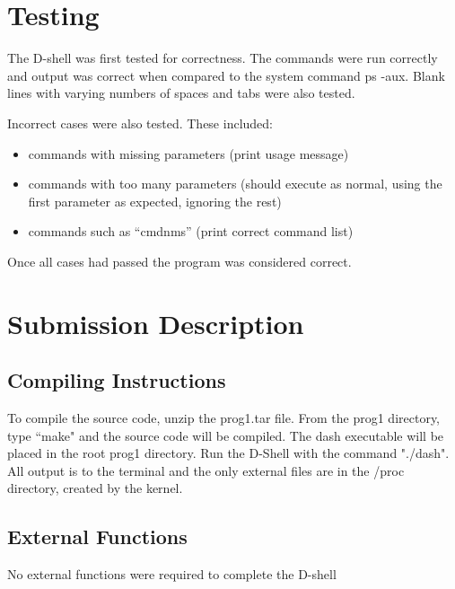 \documentclass[11pt]{article}
\begin{document}
\begin{multicols}{2}
\section{Testing}\label{testing}
The D-shell was first tested for correctness. The commands were run correctly and output was correct when compared to the system command ps -aux. Blank lines with varying numbers of spaces and tabs were also tested. 

Incorrect cases were also tested. These included:
\begin{itemize}
\item commands with missing parameters (print usage message)
\item commands with too many parameters (should execute as normal, using the first parameter as expected, ignoring the rest)
\item commands such as ``cmdnms'' (print correct command list)
\end{itemize}
Once all cases had passed the program was considered correct.

\section{Submission Description}\label{submission_description}
\subsection{Compiling Instructions}
To compile the source code, unzip the prog1.tar file. From the prog1 directory, type ``make" and the source code will be compiled. The dash executable will be placed in the root prog1 directory. Run the D-Shell with the command "./dash". All output is to the terminal and the only external files are in the /proc directory, created by the kernel.

\subsection{External Functions}
No external functions were required to complete the D-shell

\end{multicols}
\end{document}
